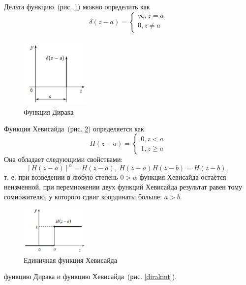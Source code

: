 \documentclass[12pt, a4paper]{article}
\begin{document}
Дельта функцию~(рис. \ref{dirac}) можно определить как 
\begin{equation}
	\label{diraca}
	\delta (z - a) = 
		\begin{cases}
			\infty, z = a \\
			0, z \neq  a	
		\end{cases}
\end{equation}

\begin{figure}[!h]
	\centering
	\includegraphics[width=0.3\textwidth]{dirac}%
	\caption{Функция Дирака}
	\vspace*{-2mm}
	\label{dirac}
\end{figure}

Функция Хевисайда~(рис. \ref{pheavi}) определяется как
\begin{equation}
	\label{heavicase}
	H(z - a) = 
	\begin{cases}
		0, z < a \\
		1, z \geqslant a	
	\end{cases}
\end{equation}
Она обладает следующими свойствами:
\[
	[H(z - a)]^\alpha = H(z - a),~
	H(z - a) H(z - b) = H(z - b),	
\]
т. е. при возведении в любую степень $0 > \alpha$ функция Хевисайда остаётся
неизменной, при перемножении двух функций Хевисайда результат равен
тому сомножителю, у которого сдвиг координаты больше: $a > b$.

\begin{figure}[!h]
	\centering
	\includegraphics[width=0.3\textwidth]{heavi}%
	\caption{Единичная функция Хевисайда}
	\vspace*{-2mm}
	\label{pheavi}
\end{figure}

 функцию Дирака и функцию Хевисайда~(рис. \ref{dirakint}).
\end{document}
